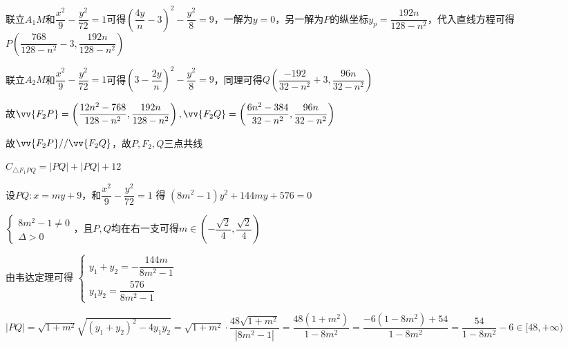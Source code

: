\begin{enumerate}
\begin{jieda}
\begin{enumerate}
            联立$A_1M$和$\dfrac{x^2}{9} - \dfrac{y^2}{72} = 1$可得$\left(\dfrac{4y}{n}-3\right)^2 - \dfrac{y^2}{8} = 9$，一解为$y = 0$，另一解为$P$的纵坐标$y_p = \dfrac{192n}{128-n^2}$，代入直线方程可得$P\left(\dfrac{768}{128-n^2}-3, \dfrac{192n}{128-n^2}\right)$

            联立$A_2M$和$\dfrac{x^2}{9} - \dfrac{y^2}{72} = 1$可得$\left(3-\dfrac{2y}{n}\right)^2 - \dfrac{y^2}{8} = 9$，同理可得$Q\left(\dfrac{-192}{32-n^2}+3, \dfrac{96n}{32-n^2}\right)$

            故$\vv{F_2P} = \left(\dfrac{12n^2-768}{128-n^2}, \dfrac{192n}{128-n^2}\right), \vv{F_2Q} = \left(\dfrac{6n^2-384}{32-n^2}, \dfrac{96n}{32-n^2}\right)$

            故$\vv{F_2P} // \vv{F_2Q}$，故$P,F_2,Q$三点共线

            $C_{\bigtriangleup {F}_{1}{PQ}} = |PQ| + |PQ| + 12$

            设$PQ: x = my + 9$，和$\dfrac{x^2}{9} - \dfrac{y^2}{72} = 1$ 得 $\left( {8{m}^{2} - 1}\right) {y}^{2} + {144my} + 576 = 0$
            
            $\left\{  \begin{array}{l} 8{m}^{2} - 1 \neq  0 \\  \Delta  > 0 \end{array}\right.$，且$P,Q$均在右一支可得$m \in \left(-\dfrac{\sqrt{2}}{4}, \dfrac{\sqrt{2}}{4}\right)$
            
            由韦达定理可得 $\left\{\begin{array}{l}
                 {y}_{1} + {y}_{2} =  - \dfrac{144m}{8{m}^{2} - 1}  \\
                 {y}_{1}{y}_{2} = \dfrac{576}{8{m}^{2} - 1}
            \end{array}\right.$

            $|PQ| = \sqrt{1+m^2} \sqrt{(y_1+y_2)^2 - 4y_1y_2} = \sqrt{1 + {m}^{2}} \cdot  \dfrac{{48}\sqrt{1 + {m}^{2}}}{\left| 8{m}^{2} - 1\right| } = \dfrac{{48}\left( {1 + {m}^{2}}\right) }{1 - 8{m}^{2}} = \dfrac{-6\left( {1 - 8{m}^{2}}\right)  + {54}}{1 - 8{m}^{2}} = \dfrac{54}{1 - 8{m}^{2}} - 6 \in  \lbrack {48}, + \infty )$


\end{enumerate}
\end{jieda}
\end{enumerate}
